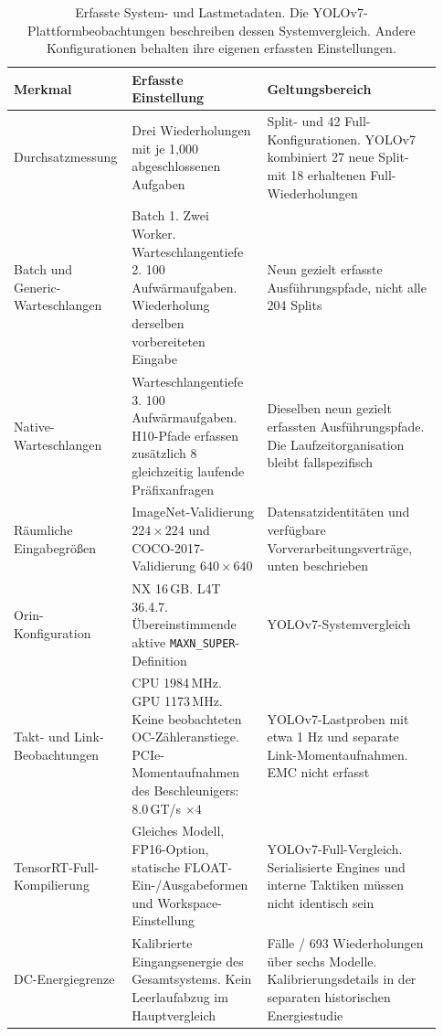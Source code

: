 \begin{table}[t]
\centering\small
\caption{Erfasste System- und Lastmetadaten. Die YOLOv7-Plattformbeobachtungen beschreiben dessen Systemvergleich. Andere Konfigurationen behalten ihre eigenen erfassten Einstellungen.}
\label{tab:supp-setup}
\setlength{\tabcolsep}{3pt}
\begin{tabular}{@{}>{\raggedright\arraybackslash}p{0.22\linewidth}>{\raggedright\arraybackslash}p{0.31\linewidth}>{\raggedright\arraybackslash}p{0.4\linewidth}@{}}
\toprule
Merkmal & Erfasste Einstellung & Geltungsbereich \\
\midrule
Durchsatzmessung & Drei Wiederholungen mit je 1,000 abgeschlossenen Aufgaben & 204 Split- und 42 Full-Konfigurationen. YOLOv7 kombiniert 27 neue Split- mit 18 erhaltenen Full-Wiederholungen \\
Batch und Generic-Warteschlangen & Batch 1. Zwei Worker. Warteschlangentiefe 2. 100 Aufwärmaufgaben. Wiederholung derselben vorbereiteten Eingabe & Neun gezielt erfasste Ausführungspfade, nicht alle 204 Splits \\
Native-Warteschlangen & Warteschlangentiefe 3. 100 Aufwärmaufgaben. H10-Pfade erfassen zusätzlich 8 gleichzeitig laufende Präfixanfragen & Dieselben neun gezielt erfassten Ausführungspfade. Die Laufzeitorganisation bleibt fallspezifisch \\
Räumliche Eingabegrößen & ImageNet-Validierung $224\times224$ und COCO-2017-Validierung $640\times640$ & Datensatzidentitäten und verfügbare Vorverarbeitungsverträge, unten beschrieben \\
Orin-Konfiguration & NX 16\,GB. L4T 36.4.7. Übereinstimmende aktive \texttt{MAXN\_SUPER}-Definition & YOLOv7-Systemvergleich \\
Takt- und Link-Beobachtungen & CPU 1984\,MHz. GPU 1173\,MHz. Keine beobachteten OC-Zähleranstiege. PCIe-Momentaufnahmen des Beschleunigers: 8.0\,GT/s $\times4$ & YOLOv7-Lastproben mit etwa 1 Hz und separate Link-Momentaufnahmen. EMC nicht erfasst \\
TensorRT-Full-Kompilierung & Gleiches Modell, FP16-Option, statische FLOAT-Ein-/Ausgabeformen und Workspace-Einstellung & YOLOv7-Full-Vergleich. Serialisierte Engines und interne Taktiken müssen nicht identisch sein \\
DC-Energiegrenze & Kalibrierte Eingangsenergie des Gesamtsystems. Kein Leerlaufabzug im Hauptvergleich & 231 Fälle / 693 Wiederholungen über sechs Modelle. Kalibrierungsdetails in der separaten historischen Energiestudie \\
\bottomrule
\end{tabular}
\end{table}
